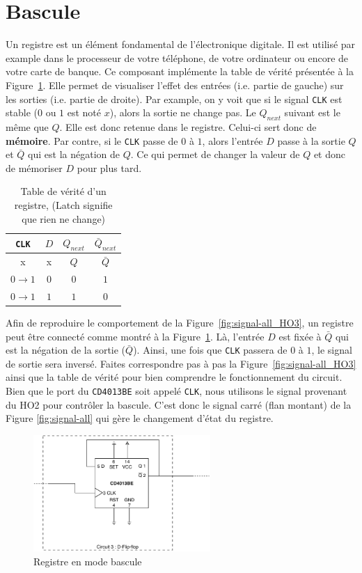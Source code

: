 \section{Bascule}
Un registre est un élément fondamental de l'électronique digitale. Il est utilisé par example dans le processeur de votre téléphone, de votre ordinateur ou encore de votre carte de banque. Ce composant implémente la table de vérité présentée à la Figure~\ref{fig:reg_tab}. Elle permet de visualiser l'effet des entrées (i.e. partie de gauche) sur les sorties (i.e. partie de droite). Par example, on y voit que si le signal \texttt{CLK} est stable ($0$ ou $1$ est noté $x$), alors la sortie ne change pas. Le $Q_{next}$ suivant est le même que $Q$. Elle est donc retenue dans le registre. Celui-ci sert donc de \textbf{mémoire}. Par contre, si le \texttt{CLK} passe de $0$ à $1$, alors l'entrée $D$ passe à la sortie $Q$ et $\bar{Q}$ qui est la négation de $Q$. Ce qui permet de changer la valeur de $Q$ et donc de mémoriser $D$ pour plus tard. 

\begin{table}[h!]
\centering
\begin{tabular}{|c|c || c |c | }
\hline 
\texttt{CLK} & $D$ & $Q_{next}$ & $\bar{Q}_{next}$\\ \hline \hline
x   & x   & $Q$   & $\bar{Q}$ \\ \hline
$0\to1$ & $0$ & $0$ & $1$ \\ \hline 
$0\to1$ & $1$ & $1$ & $0$ \\ \hline 
\end{tabular}
    \caption{Table de vérité d'un registre, (Latch signifie que rien ne change)}
    \label{fig:reg_tab}
\end{table}

Afin de reproduire le comportement de la Figure~\ref{fig:signal-all_HO3}, un registre peut être connecté comme montré à la Figure~\ref{fig:DFFbascule}. Là, l'entrée $D$ est fixée à $\bar{Q}$ qui est la négation de la sortie ($\bar{Q}$). Ainsi, une fois que \texttt{CLK} passera de $0$ à $1$, le signal de sortie sera inversé. Faites correspondre pas à pas la Figure~\ref{fig:signal-all_HO3} ainsi que la table de vérité pour bien comprendre le fonctionnement du circuit. Bien que le port du \texttt{CD4013BE} soit appelé \texttt{CLK}, nous utilisons le signal provenant du HO2 pour contrôler la bascule. C'est donc le signal carré (flan montant) de la Figure \ref{fig:signal-all} qui gère le changement d'état du registre. \\

\begin{figure}[h!]
    \centering
    \includegraphics[width=0.6\textwidth]{HO3_dff.pdf}
    \caption{Registre en mode bascule}
    \label{fig:DFFbascule}
\end{figure}
\medskip

